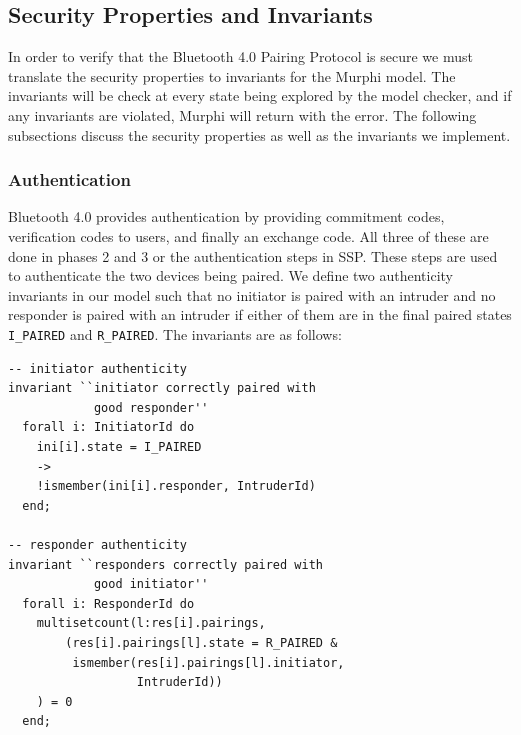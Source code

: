 \documentclass{acm_proc_article-sp}
\begin{document}
\subsection{Security Properties and Invariants}
In order to verify that the Bluetooth 4.0 Pairing Protocol is secure we must translate the security properties to invariants for the Murphi model. The invariants will be check at every state being explored by the model checker, and if any invariants are violated, Murphi will return with the error. The following subsections discuss the security properties as well as the invariants we implement.

\subsubsection{Authentication}
Bluetooth 4.0 provides authentication by providing commitment codes, verification codes to users, and finally an exchange code. All three of these are done in phases 2 and 3 or the authentication steps in SSP. These steps are used to authenticate the two devices being paired. We define two authenticity invariants in our model such that no initiator is paired with an intruder and no responder is paired with an intruder if either of them are in the final paired states \texttt{I\_PAIRED} and \texttt{R\_PAIRED}. The invariants are as follows:

\begin{verbatim}
-- initiator authenticity
invariant ``initiator correctly paired with 
            good responder''
  forall i: InitiatorId do
    ini[i].state = I_PAIRED 
    ->
    !ismember(ini[i].responder, IntruderId)
  end;

-- responder authenticity
invariant ``responders correctly paired with 
            good initiator''
  forall i: ResponderId do
    multisetcount(l:res[i].pairings, 
        (res[i].pairings[l].state = R_PAIRED &
         ismember(res[i].pairings[l].initiator,
                  IntruderId))
    ) = 0
  end;
\end{verbatim}
\end{document}
